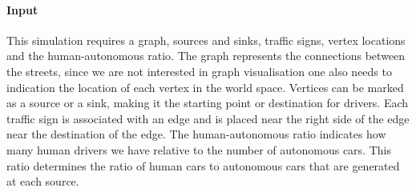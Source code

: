 \paragraph{Input}
\label{par:method:model:details:input}
This simulation requires a graph, sources and sinks, traffic signs, vertex locations and the human-autonomous ratio. The graph represents the connections between the streets, since we are not interested in graph visualisation one also needs to indication the location of each vertex in the world space. Vertices can be marked as a source or a sink, making it the starting point or destination for drivers. Each traffic sign is associated with an edge and is placed near the right side of the edge near the destination of the edge. The human-autonomous ratio indicates how many human drivers we have relative to the number of autonomous cars. This ratio determines the ratio of human cars to autonomous cars that are generated at each source.
